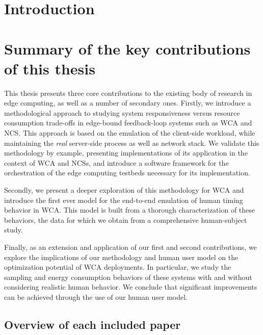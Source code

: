 \section{Introduction}



\section{Summary of the key contributions of this thesis}

This thesis presents three core contributions to the existing body of research in edge computing, as well as a number of secondary ones.
Firstly, we introduce a methodological approach to studying system responsiveness versus resource consumption trade-offs in edge-bound feedback-loop systems such as \gls{WCA} and \gls{NCS}.
This approach is based on the emulation of the client-side workload, while maintaining the \emph{real} server-side process as well as network stack.
We validate this methodology by example, presenting implementations of its application in the context of \gls{WCA} and \glspl{NCS}, and introduce a software framework for the orchestration of the edge computing testbeds necessary for its implementation.

Secondly, we present a deeper exploration of this methodology for \gls{WCA} and introduce the first ever model for the end-to-end emulation of human timing behavior in \gls{WCA}.
This model is built from a thorough characterization of these behaviors, the data for which we obtain from a comprehensive human-subject study.

Finally, as an extension and application of our first and second contributions, we explore the implications of our methodology and human user model on the optimization potential of \gls{WCA} deployments.
In particular, we study the sampling and energy consumption behaviors of these systems with and without considering realistic human behavior.
We conclude that significant improvements can be achieved through the use of our human user model.

\subsection{Overview of each included paper}

